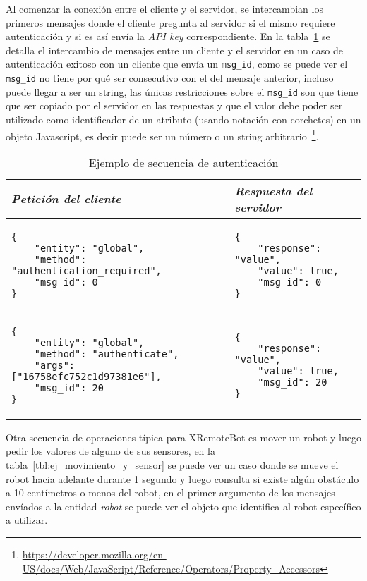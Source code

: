 Al comenzar la conexión entre el cliente y el servidor, se intercambian
los primeros mensajes donde el cliente pregunta al servidor si el
mismo requiere autenticación y si es así envía la \textit{API key}
correspondiente. En la tabla~\ref{tbl:ej_autenticacion} se detalla
el intercambio de mensajes entre un cliente y el servidor en un
caso de autenticación exitoso con un cliente que envía un \texttt{msg\_id},
como se puede ver el \texttt{msg\_id}
no tiene por qué ser consecutivo con el del mensaje anterior, incluso
puede llegar a ser un string, las únicas restricciones sobre el
\texttt{msg\_id} son que tiene que ser copiado por el servidor
en las respuestas y que el valor debe poder ser utilizado como
identificador de un atributo (usando notación con corchetes) en un
objeto Javascript, es decir puede ser un número o un string
arbitrario~\footnote{\url{https://developer.mozilla.org/en-US/docs/Web/JavaScript/Reference/Operators/Property\_Accessors}}.

\begin{table}
    \centering
    \begin{tabular}{|m{}|m{}|}
        \hline
        \textit{Petición del cliente} & \textit{Respuesta del servidor} \\
        \hline
\begin{Verbatim}[fontsize=\footnotesize]
{
    "entity": "global",
    "method": "authentication_required",
    "msg_id": 0
}
\end{Verbatim}
&
\begin{Verbatim}[fontsize=\footnotesize]
{
    "response": "value",
    "value": true,
    "msg_id": 0
}
\end{Verbatim}
\\
\hline
\begin{Verbatim}[fontsize=\footnotesize]
{
    "entity": "global",
    "method": "authenticate",
    "args": ["16758efc752c1d97381e6"],
    "msg_id": 20
}
\end{Verbatim}
&
\begin{Verbatim}[fontsize=\footnotesize]
{
    "response": "value",
    "value": true,
    "msg_id": 20
}
\end{Verbatim}
\\
\hline
    \end{tabular}
    \caption{Ejemplo de secuencia de autenticación}
    \label{tbl:ej_autenticacion}
\end{table}

Otra secuencia de operaciones típica para XRemoteBot es mover un robot
y luego pedir los valores de alguno de sus sensores, en la
tabla~\ref{tbl:ej_movimiento_y_sensor} se puede ver un caso donde se
mueve el robot hacia adelante durante 1 segundo y luego consulta si
existe algún obstáculo a 10 centímetros o menos del robot, en el primer
argumento de los mensajes
envíados a la entidad \textit{robot} se puede ver el objeto que identifica
al robot específico a utilizar.

